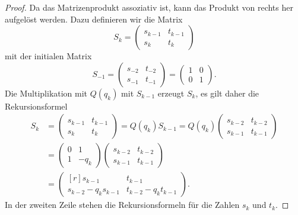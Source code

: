 \begin{proof}
Da das Matrizenprodukt assoziativ ist, kann das Produkt von rechts
her aufgelöst werden.
Dazu definieren wir die Matrix
\[
S_k
= 
\begin{pmatrix}
s_{k-1} & t_{k-1} \\
s_{k}   & t_{k} 
\end{pmatrix}
\]
mit der initialen Matrix
\[
S_{-1}
=
\begin{pmatrix}
s_{-2} & t_{-2} \\
s_{-1} & t_{-1} 
\end{pmatrix}
=
\begin{pmatrix}
1 & 0\\
0 & 1
\end{pmatrix}.
\]
Die Multiplikation mit $Q(q_k)$ mit $S_{k-1}$ erzeugt $S_k$, es gilt
daher die Rekursionsformel
\begin{align*}
S_k
&= 
\begin{pmatrix}
s_{k-1} & t_{k-1} \\
s_{k}   & t_{k} 
\end{pmatrix}
=
Q(q_k)
S_{k-1}
=
Q(q_k)
\begin{pmatrix}
s_{k-2} & t_{k-2} \\
s_{k-1} & t_{k-1} 
\end{pmatrix}
\\
&=
\begin{pmatrix}
0&1\\
1&-q_k
\end{pmatrix}
\begin{pmatrix}
s_{k-2} & t_{k-2} \\
s_{k-1} & t_{k-1} 
\end{pmatrix}
\\
&=
\begin{pmatrix*}[r]
s_{k-1}            & t_{k-1}           \\
s_{k-2}-q_ks_{k-1} & t_{k-2}-q_kt_{k-1} 
\end{pmatrix*}.
\end{align*}
In der zweiten Zeile stehen die Rekursionsformeln für die
Zahlen $s_k$ und $t_k$.
\end{proof}

